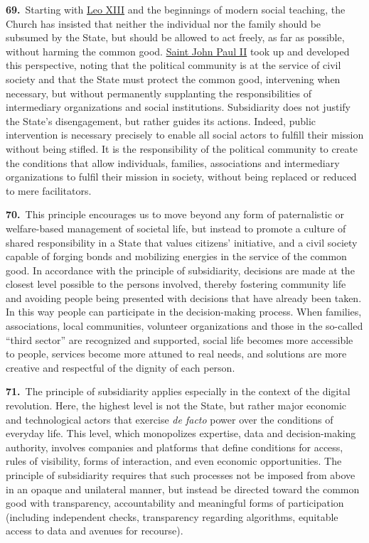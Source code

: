 \documentclass{article}
\begin{document}
\textbf{69.}\ Starting with \href{https://www.vatican.va/content/leo-xiii/en.html}{Leo XIII} and the beginnings of modern social teaching, the Church has insisted that neither the individual nor the family should be subsumed by the State, but should be allowed to act freely, as far as possible, without harming the common good.\cite{n92} \href{https://www.vatican.va/content/john-paul-ii/en.html}{Saint John Paul II} took up and developed this perspective, noting that the political community is at the service of civil society and that the State must protect the common good, intervening when necessary, but without permanently supplanting the responsibilities of intermediary organizations and social institutions.\cite{n93} Subsidiarity does not justify the State's disengagement, but rather guides its actions. Indeed, public intervention is necessary precisely to enable all social actors to fulfill their mission without being stifled. It is the responsibility of the political community to create the conditions that allow individuals, families, associations and intermediary organizations to fulfil their mission in society, without being replaced or reduced to mere facilitators.\cite{n94}

\textbf{70.}\ This principle encourages us to move beyond any form of paternalistic or welfare-based management of societal life, but instead to promote a culture of shared responsibility in a State that values citizens' initiative, and a civil society capable of forging bonds and mobilizing energies in the service of the common good. In accordance with the principle of subsidiarity, decisions are made at the closest level possible to the persons involved, thereby fostering community life and avoiding people being presented with decisions that have already been taken. In this way people can participate in the decision-making process. When families, associations, local communities, volunteer organizations and those in the so-called ``third sector'' are recognized and supported, social life becomes more accessible to people, services become more attuned to real needs, and solutions are more creative and respectful of the dignity of each person.\cite{n95}

\textbf{71.}\ The principle of subsidiarity applies especially in the context of the digital revolution. Here, the highest level is not the State, but rather major economic and technological actors that exercise \emph{de facto} power over the conditions of everyday life. This level, which monopolizes expertise, data and decision-making authority, involves companies and platforms that define conditions for access, rules of visibility, forms of interaction, and even economic opportunities. The principle of subsidiarity requires that such processes not be imposed from above in an opaque and unilateral manner, but instead be directed toward the common good with transparency, accountability and meaningful forms of participation (including independent checks, transparency regarding algorithms, equitable access to data and avenues for recourse).\cite{n96}
\end{document}
